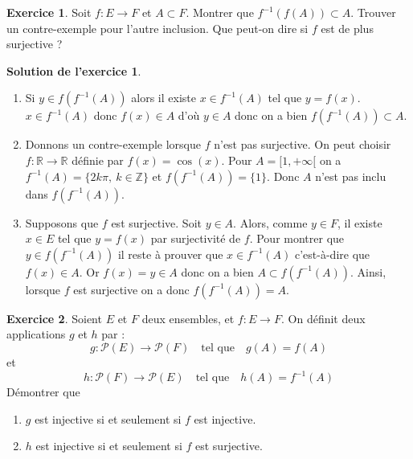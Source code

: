 \documentclass[a4paper, 11pt,openany]{article}%
\theoremstyle{plain}
\theoremstyle{definition}
\newtheorem{exo}{Exercice}
\newtheorem{sol}{Solution de l'exercice}
\theoremstyle{remark}
\begin{document}
\begin{exo}
Soit $f :E \to F$ et $A \subset F$. Montrer que $ f^{-1}(f(A)) \subset A$. Trouver un contre-exemple pour l'autre inclusion. Que peut-on dire si $f$ est de plus surjective ?
\end{exo}

\begin{sol}
\begin{enumerate}
 \item Si $y\in f(f^{-1}(A))$ alors il existe $x\in f^{-1}(A)$ tel que $y=f(x)$. $x\in f^{-1}(A)$ donc $f(x)\in A$ d'où $y\in A$ donc on a bien $f(f^{-1}(A)) \subset A$. 
 \item Donnons un contre-exemple lorsque $f$ n'est pas surjective. On peut choisir $f\colon \mathbb R \to \mathbb R$ définie par $f(x)=\cos(x)$. Pour $A=[1,+\infty[$ on a $f^{-1}(A)=\{2k\pi, \ k\in \mathbb Z\}$ et $f(f^{-1}(A))=\{1\}$. Donc $A$ n'est pas inclu dans $f(f^{-1}(A))$.
 \item Supposons que $f$ est surjective. Soit $y\in A$. Alors, comme $y\in F$, il existe $x\in E$ tel que $y=f(x)$ par surjectivité de $f$. Pour montrer que $y\in f(f^{-1}(A))$ il reste à prouver que $x\in f^{-1}(A)$ c'est-à-dire que $f(x)\in A$. Or $f(x)=y \in A$ donc on a bien $A\subset f(f^{-1}(A))$. Ainsi, lorsque $f$ est surjective on a donc $f(f^{-1}(A))=A$.
\end{enumerate}
\end{sol}
   

\begin{exo}
Soient $E$ et $F$ deux ensembles, et $f:E \to F$. On définit deux applications $g$ et $h$ par :
\[ g : \mathcal{P}(E) \to \mathcal{P}(F) \quad \text{tel que} \quad g(A) = f(A)\]
et 
\[ h : \mathcal{P}(F) \to \mathcal{P}(E) \quad \text{tel que} \quad h(A) = f^{-1}(A)\]
Démontrer que
\begin{enumerate}
\item $g$ est injective si et seulement si $f$ est injective.
\item $h$ est injective si et seulement si $f$ est surjective. 
\end{enumerate}
\end{exo}
\end{document}

